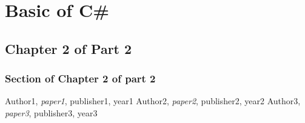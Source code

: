 \documentclass[A4 paper,openany]{book}  %
\begin{document}
\part{Basic of C\#}
\chapter{Chapter 2 of Part 2}
\section{Section of Chapter 2 of part 2}


\printindex

\begin{thebibliography}{100}
     Author1, \textit{paper1}, publisher1, year1
     Author2, \textit{paper2}, publisher2, year2
     Author3, \textit{paper3}, publisher3, year3
\end{thebibliography}
\end{document}
